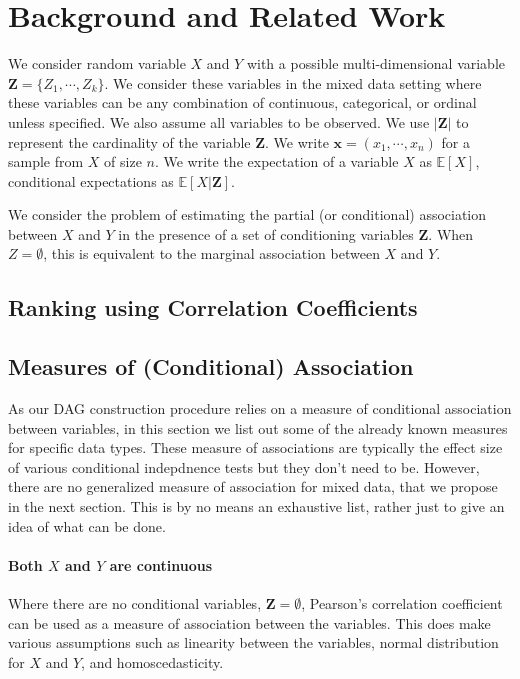 \documentclass{uai2025} %
\begin{document}
\section{Background and Related Work}
\label{sec:background}
We consider random variable $ X $ and $ Y $ with a possible multi-dimensional
variable $ \bm{Z} = \{ Z_1, \cdots, Z_k \} $. We consider these variables in
the mixed data setting where these variables can be any combination of
continuous, categorical, or ordinal unless specified. We also assume all
variables to be observed. We use $ \rvert \bm{Z} \rvert $ to represent the
cardinality of the variable $ \bm{Z} $. We write $ \bm{x} = (x_1, \cdots, x_n)
$ for a sample from $ X $ of size $ n $. We write the expectation of a variable
$ X $ as $ \mathbb{E}[X] $, conditional expectations as $ \mathbb{E}[X |
\bm{Z}] $.

We consider the problem of estimating the partial (or conditional) association
between $ X $ and $ Y $ in the presence of a set of conditioning variables $
\bm{Z} $. When $ Z = \emptyset $, this is equivalent to the marginal
association between $ X $ and $ Y $.

\subsection{Ranking using Correlation Coefficients}

\subsection{Measures of (Conditional) Association}
As our DAG construction procedure relies on a measure of conditional
association between variables, in this section we list out some of the already
known measures for specific data types. These measure of associations are
typically the effect size of various conditional indepdnence tests but they
don't need to be. However, there are no generalized measure of association for
mixed data, that we propose in the next section. This is by no means an
exhaustive list, rather just to give an idea of what can be done.

\paragraph{Both $ X $ and $ Y $ are continuous}
Where there are no conditional variables, $ \bm{Z} = \emptyset $, Pearson's
correlation coefficient can be used as a measure of association between the
variables. This does make various assumptions such as linearity between the
variables, normal distribution for $ X $ and $ Y $, and homoscedasticity.
\end{document}
